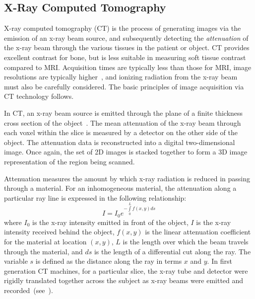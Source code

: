 \subsection{X-Ray Computed Tomography}
\label{X-Ray Computed Tomography}

X-ray computed tomography (CT) is the process of generating images via the emission of an x-ray beam source, and subsequently detecting the \textit{attenuation} of the x-ray beam through the various tissues in the patient or object. CT provides excellent contrast for bone, but is less suitable in measuring soft tissue contrast compared to MRI. Acquisition times are typically less than those for MRI, image resolutions are typically higher~\cite{pomeranz_2007}, and ionizing radiation from the x-ray beam must also be carefully considered. The basic principles of image acquisition via CT technology follows.

In CT, an x-ray beam source is emitted through the plane of a finite thickness cross section of the object~\cite{mahesh_2002}. The mean attenuation of the x-ray beam through each voxel within the slice is measured by a detector on the other side of the object. The attenuation data is reconstructed into a digital two-dimensional image. Once again, the set of 2D images is stacked together to form a 3D image representation of the region being scanned.

Attenuation measures the amount by which x-ray radiation is reduced in passing through a material. For an inhomogeneous material, the attenuation along a particular ray line is expressed in the following relationship:
\begin{equation}
I= I_0e^{-\int\limits_{0}^{L}f(x,y) ds}
\label{eqn:init}
\end{equation}
where $I_0$ is the x-ray intensity emitted in front of the object, $I$ is the x-ray intensity received behind the object, $f(x,y)$ is the linear attenuation coefficient for the material at location $(x,y)$, $L$ is the length over which the beam travels through the material, and $ds$ is the length of a differential cut along the ray. The variable $s$ is defined as the distance along the ray in terms $x$ and $y$. In first generation CT machines, for a particular slice, the x-ray tube and detector were rigidly translated together across the subject as x-ray beams were emitted and recorded~(see~).

